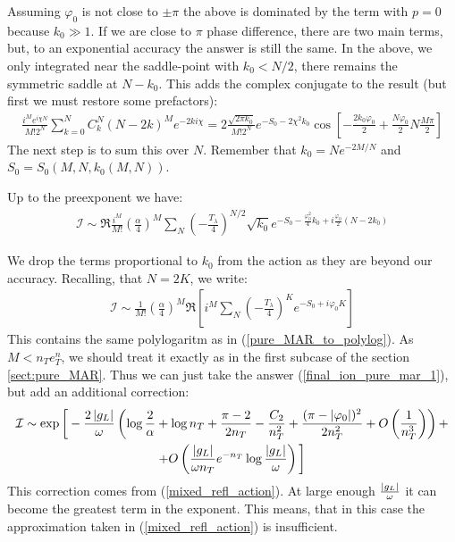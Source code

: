 Assuming $\varphi_{0}$ is not close to $\pm\pi$ the above is dominated
by the term with $p=0$ because $k_{0}\gg1$. If we are close to $\pi$
phase difference, there are two main terms, but, to an exponential
accuracy the answer is still the same.
In the above, we only integrated near the saddle-point with $k_{0}<N/2$,
there remains the symmetric saddle at $N-k_{0}$. This adds the complex
conjugate to the result (but first we must restore some prefactors):
\begin{gather}
\frac{i^{M}e^{i\chi N}}{M!2^{N}}\sum_{k=0}^{N}C_{k}^{N}(N-2k)^{M}e^{-2ki\chi}
=
2\frac{\sqrt{2\pi k_{0}}}{M!2^{N}}
e^{-S_{0}-2\chi^{2}k_{0}}
\cos\left[
-\frac{2k_{0}\varphi_0}{2}
+
\frac{N\varphi_0}{2}
 N\frac{M\pi}{2}\right]
\end{gather}
The next step is to sum this over $N$. Remember that $k_{0}=Ne^{-2M/N}$
and $S_{0}=S_{0}(M,N,k_{0}(M,N))$. 

Up to the preexponent we have:
\begin{gather}
	\mathcal{I}
	\sim
	\Re\frac{i^{M}}{M!}\left(\frac{\alpha}{4}\right)^{M}\sum_{N}\left(-\frac{T_{\lambda}}{4}\right)^{N/2}\sqrt{k_{0}}e^{-S_{0}-\frac{\varphi_0^2}{4}k_{0}+i\frac{\varphi_0}{2}(N-2k_{0})}
\end{gather}

We drop the terms proportional to $ k_0 $ from the action as they are beyond our accuracy. Recalling, that $ N=2K $, we write:
\begin{gather}
	\mathcal{I}
	\sim
	\frac{1}{M!}
	\left(\frac{\alpha}{4}\right)^{M}\Re
	\left[ i^{M}
	\sum_{N}
	\left(-\frac{T_{\lambda}}{4}\right)^{K}
	e^{-S_{0}+i\varphi_{0}K}
	\right]
\end{gather}
This contains the same polylogaritm as in (\ref{pure_MAR_to_polylog}). As $ M<n_Te^n_T $, we should treat it exactly as in the first subcase of the section \ref{sect:pure_MAR}. Thus we can just take the answer (\ref{final_ion_pure_mar_1}), but add an additional correction:
\begin{multline}
		\mathcal{I}
	\sim
	\exp
	\bigg[
		-
		\frac
		{2\left|g_L\right|}
		{\omega}
		\left(
			\log
			\frac{2}{\alpha}
			+
			\log n_T
			+
			\frac{\pi-2}{2n_T}
			-
			\frac{C_2}{n_T^2}
			+
			\frac{(\pi-|\varphi_{0}|)^{2}}{2n_T^{2}}
			+
			O\left(\frac{1}{n_T^3}\right)
		\right)
	+
	\\
	+
	O
	\left( 		\frac{\left|g_L\right|}{\omega n_T}
			e^{-n_T}
			\log\frac{\left|g_L\right|}{\omega}
	\right)		
	\bigg]
\end{multline}
This correction comes from (\ref{mixed_refl_action}). At large enough $ \frac{\left|g_L\right|}{\omega} $ it can become the greatest term in the exponent. This means, that in this case the approximation taken in (\ref{mixed_refl_action}) is insufficient.  

